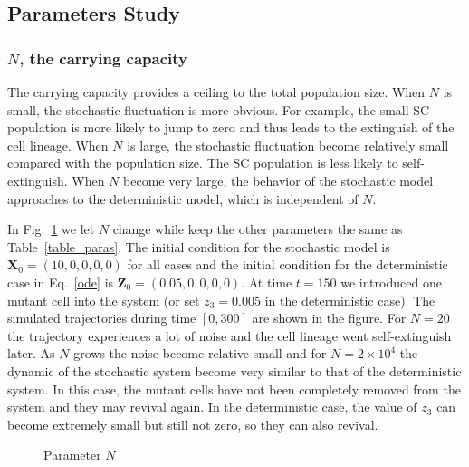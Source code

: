 \documentclass[12pt]{article}
\begin{document}
\subsection*{Parameters Study}

\subsubsection*{$N$, the carrying capacity}
The carrying capacity provides a ceiling to the total population
size. When $N$ is small, the stochastic fluctuation is more
obvious. For example, the small SC population is more likely 
to jump to zero and thus leads to the extinguish of the cell 
lineage. When $N$ is large, the stochastic fluctuation become
relatively small compared with the population size. The SC 
population is less likely to self-extinguish. When $N$ become
very large, the behavior of the stochastic model approaches to
the deterministic model, which is independent of $N$.

In Fig.~\ref{afig_paraN} we let $N$ change while keep the other
parameters the same as Table~\ref{table_paras}. 
The initial condition for the stochastic model is 
$\mathbf{X}_0 = (10, 0, 0, 0, 0)$ for all cases and the initial 
condition for the deterministic case in Eq.~\eqref{ode} is 
$\mathbf{Z}_0 = (0.05, 0, 0, 0, 0)$. At time $t=150$ we
introduced one mutant cell into the system (or set $z_3=0.005$ 
in the deterministic case). The simulated trajectories
during time $[0, 300]$ are shown in the figure. 
For $N = 20$ the trajectory experiences a lot of noise and 
the cell lineage went self-extinguish later. As $N$ grows
the noise become relative small and for $N=2\times 10^4$ the
dynamic of the stochastic system become very similar to that of
the deterministic system. In this case, the mutant cells have not
been completely removed from the system and they may
revival again. In the deterministic case, the value of $z_3$
can become extremely small but still not zero, so they can
also revival.
 
\begin{figure}
\centering
{}
\caption{Parameter $N$}
\label{afig_paraN}
\end{figure}
\end{document}
